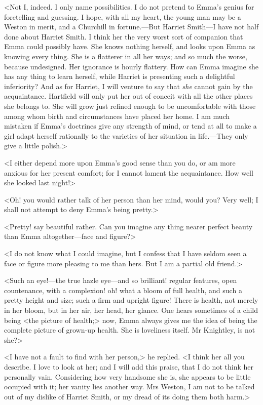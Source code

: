 <Not I, indeed. I only name possibilities. I do not pretend to Emma's genius for foretelling and guessing. I hope, with all my heart, the young man may be a Weston in merit, and a Churchill in fortune.—But Harriet Smith—I have not half done about Harriet Smith. I think her the very worst sort of companion that Emma could possibly have. She knows nothing herself, and looks upon Emma as knowing every thing. She is a flatterer in all her ways; and so much the worse, because undesigned. Her ignorance is hourly flattery. How can Emma imagine she has any thing to learn herself, while Harriet is presenting such a delightful inferiority? And as for Harriet, I will venture to say that \textit{she} cannot gain by the acquaintance. Hartfield will only put her out of conceit with all the other places she belongs to. She will grow just refined enough to be uncomfortable with those among whom birth and circumstances have placed her home. I am much mistaken if Emma's doctrines give any strength of mind, or tend at all to make a girl adapt herself rationally to the varieties of her situation in life.—They only give a little polish.>

<I either depend more upon Emma's good sense than you do, or am more anxious for her present comfort; for I cannot lament the acquaintance. How well she looked last night!>

<Oh! you would rather talk of her person than her mind, would you? Very well; I shall not attempt to deny Emma's being pretty.>

<Pretty! say beautiful rather. Can you imagine any thing nearer perfect beauty than Emma altogether—face and figure?>

<I do not know what I could imagine, but I confess that I have seldom seen a face or figure more pleasing to me than hers. But I am a partial old friend.>

<Such an eye!—the true hazle eye—and so brilliant! regular features, open countenance, with a complexion! oh! what a bloom of full health, and such a pretty height and size; such a firm and upright figure! There is health, not merely in her bloom, but in her air, her head, her glance. One hears sometimes of a child being <the picture of health;> now, Emma always gives me the idea of being the complete picture of grown-up health. She is loveliness itself. Mr Knightley, is not she?>

<I have not a fault to find with her person,> he replied. <I think her all you describe. I love to look at her; and I will add this praise, that I do not think her personally vain. Considering how very handsome she is, she appears to be little occupied with it; her vanity lies another way. Mrs Weston, I am not to be talked out of my dislike of Harriet Smith, or my dread of its doing them both harm.>

